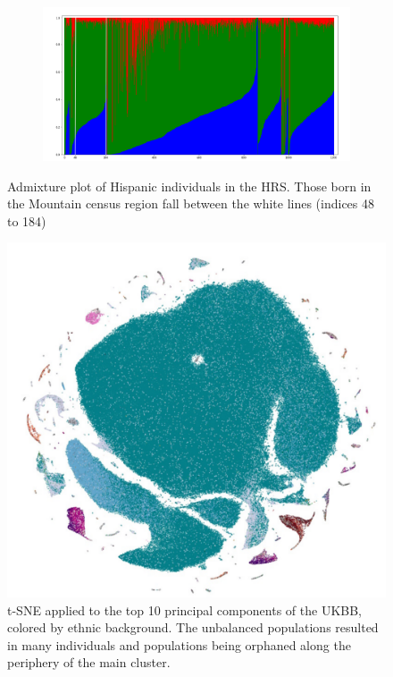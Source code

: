 \documentclass[12pt]{pnas-new}
\begin{document}
\begin{figure}
    \centering
    \begin{subfigure}{\textwidth}
    \includegraphics[width=\textwidth]{images/admixture_plot_highlight_mountain_copy.pdf}
    \end{subfigure}
    \caption{Admixture plot of Hispanic individuals in the HRS. Those born in the Mountain census region fall between the white lines (indices 48 to 184)}
    \label{fig:supp_hrs_hisp_admix}
\end{figure}

\begin{figure}[!htb]
    \centering
    \includegraphics[width=0.95\columnwidth]{images/UKBB_TSNE_10PCs_DefaultPerplexity_eth.pdf}
    \caption{t-SNE applied to the top 10 principal components of the UKBB, colored by ethnic background. The unbalanced populations resulted in many individuals and populations being orphaned along the periphery of the main cluster.}
    \label{fig:supp_ukbb_tsne}
\end{figure}
\end{document}
